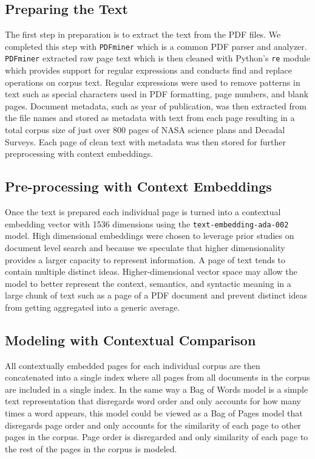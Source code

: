 \documentclass[preprint,12pt]{elsarticle}
\begin{document}
\subsection{Preparing the Text}
The first step in preparation is to extract the text from the PDF files. We completed this step with \texttt{PDFminer} which is a common PDF parser and analyzer\cite{pdfminer}. \texttt{PDFminer} extracted raw page text which is then cleaned with Python's \texttt{re} module which provides support for regular expressions and conducts find and replace operations on corpus text. Regular expressions were used to remove patterns in text such as special characters used in PDF formatting, page numbers, and blank pages. Document metadata, such as year of publication, was then extracted from the file names and stored as metadata with text from each page resulting in a total corpus size of just over 800 pages of NASA science plans and Decadal Surveys. Each page of clean text with metadata was then stored for further preprocessing with context embeddings. 

\subsection{Pre-processing with Context Embeddings}

Once the text is prepared each individual page is turned into a contextual embedding vector with 1536 dimensions using the \texttt{text-embedding-ada-002} model. High dimensional embeddings were chosen to leverage prior studies on document level search \cite{Aperdannier2024_embedding_search} and because we speculate that higher dimensionality provides a larger capacity to represent information. A page of text tends to contain multiple distinct ideas.  Higher-dimensional vector space may allow the model to better represent the context, semantics, and syntactic meaning in a large chunk of text such as a page of a PDF document and prevent distinct ideas from getting aggregated into a generic average. 

\subsection{Modeling with Contextual Comparison}
All contextually embedded pages for each individual corpus are then concatenated into a single index where all pages from all documents in the corpus are included in a single index. In the same way a Bag of Words model\cite{harris1954} is a simple text representation that disregards word order and only accounts for how many times a word appears, this model could be viewed as a Bag of Pages model that disregards page order and only accounts for the similarity of each page to other pages in the corpus. Page order is disregarded and only similarity of each page to the rest of the pages in the corpus is modeled. 
\end{document}
